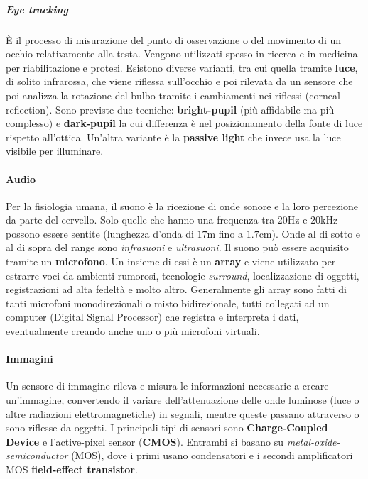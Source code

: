 \subparagraph{Eye tracking} È il processo di misurazione del punto di osservazione o del movimento di un occhio relativamente alla testa. Vengono utilizzati spesso in ricerca e in medicina per riabilitazione e protesi. Esistono diverse varianti, tra cui quella tramite \textbf{luce}, di solito infrarossa, che viene riflessa sull'occhio e poi rilevata da un sensore che poi analizza la rotazione del bulbo tramite i cambiamenti nei riflessi (corneal reflection). Sono previste due tecniche: \textbf{bright-pupil} (più affidabile ma più complesso) e \textbf{dark-pupil} la cui differenza è nel posizionamento della fonte di luce rispetto all'ottica. Un'altra variante è la \textbf{passive light} che invece usa la luce visibile per illuminare.

\paragraph{Audio} Per la fisiologia umana, il suono è la ricezione di onde sonore e la loro percezione da parte del cervello. Solo quelle che hanno una frequenza tra $20$Hz e $20$kHz possono essere sentite (lunghezza d'onda di $17$m fino a $1.7$cm). Onde al di sotto e al di sopra del range sono \textit{infrasuoni} e \textit{ultrasuoni}. Il suono può essere acquisito tramite un \textbf{microfono}. Un insieme di essi è un \textbf{array} e viene utilizzato per estrarre voci da ambienti rumorosi, tecnologie \textit{surround}, localizzazione di oggetti, registrazioni ad alta fedeltà e molto altro. Generalmente gli array sono fatti di tanti microfoni monodirezionali o misto bidirezionale, tutti collegati ad un computer (Digital Signal Processor) che registra e interpreta i dati, eventualmente creando anche uno o più microfoni virtuali.

\paragraph{Immagini} Un sensore di immagine rileva e misura le informazioni necessarie a creare un'immagine, convertendo il variare dell'attenuazione delle onde luminose (luce o altre radiazioni elettromagnetiche) in segnali, mentre queste passano attraverso o sono riflesse da oggetti. I principali tipi di sensori sono \textbf{Charge-Coupled Device} e l'active-pixel sensor (\textbf{CMOS}). Entrambi si basano su \textit{metal-oxide-semiconductor} (MOS), dove i primi usano condensatori e i secondi amplificatori MOS \textbf{field-effect transistor}.

